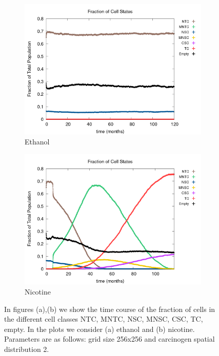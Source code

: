 \documentclass[\main/thesis.tex]{subfiles}
\begin{document}
\begin{figure}[H]
    \centering
    \begin{subfigure}[t]{.6\textwidth}
      \centering
      \includegraphics[width=\textwidth]{images/4_CarcinFunc/Fig6/numState_all_Carcin0.png}
      \caption{Ethanol}
      \label{fig:CarcinFunc_numState_Carcin0}
    \end{subfigure}
    \begin{subfigure}[t]{.6\textwidth}
      \centering
      \includegraphics[width=\textwidth]{images/4_CarcinFunc/Fig6/numState_all_Carcin1.png}
      \caption{Nicotine}
      \label{fig:CarcinFunc_numState_Carcin1}
    \end{subfigure}
    \caption{In figures (a),(b) we show the time course of the fraction of cells in the different cell classes NTC, MNTC, NSC, MNSC, CSC, TC, empty. In the plots we consider (a) ethanol and (b) nicotine. Parameters are as follows: grid size 256x256 and carcinogen spatial distribution 2.}
    \label{fig:CarcinFunc_numState_Carcins}
\end{figure}
\end{document}
